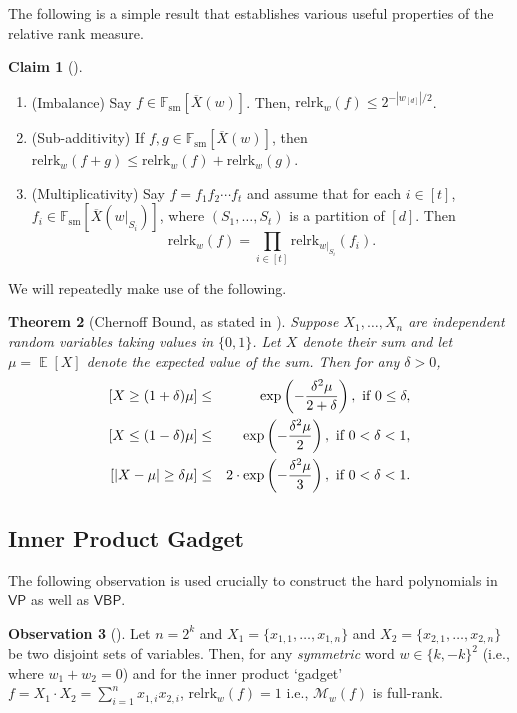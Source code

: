 \documentclass[10pt,a4paper]{article}
\newtheorem{theorem}{Theorem}[section]
\theoremstyle{definition}%
\newtheorem{claim}[theorem]{Claim}
\newtheorem{obs}[theorem]{Observation}
\theoremstyle{plain}
\DeclareMathOperator*{\E}{\mathbb{E}}
\let\Pr\relax
\DeclareMathOperator*{\Pr}{\mathbb{P}}
\newcommand{\rk}{\mathrm{relrk}}
\newcommand{\VP}{\mathsf{VP}}
\newcommand{\VBP}{\mathsf{VBP}}
\newcommand{\zo}{\{0,1\}}
\newcommand{\sumi}{\sum_{i=1}^n}
\newcommand{\Fsm}{\mathbb{F}_{\mathrm{sm}}}
\newcommand{\ol}[1]{\overline{#1}}
\newcommand{\calM}{\mathcal{M}}
\begin{document}
The following is a simple result that establishes various useful properties of the relative rank measure.
\begin{claim}[\cite{LST1}]\label{clm:rk-props}
\begin{enumerate}
    \item(Imbalance) Say $f \in \Fsm[\ol{X}(w)]$. Then, $\rk_w(f)\leq 2^{-|w_{[d]}|/2}$.
    \item(Sub-additivity) If $f,g \in \Fsm[\ol{X}(w)]$, then $\rk_w(f+g)\leq \rk_w(f)+\rk_w(g)$.
    \item(Multiplicativity) Say $f = f_1 f_2\cdots f_t $ and assume that for each $i\in [t]$, $f_i\in \Fsm[\ol{X}(w|_{S_i})]$, where $(S_1, \ldots, S_t)$ is a partition of $[d]$. Then
    \[
    \rk_w(f) = \prod_{i\in[t]} \rk_{w|_{S_i}}(f_i).
    \]
\end{enumerate}
\end{claim}

We will repeatedly make use of the following.

\begin{theorem}[Chernoff Bound, as stated in \cite{mitzenmacher_upfal_2005}]\label{thm:Chernoff}
Suppose $X_1, \ldots, X_n$ are independent random variables taking values in $\zo$. Let $X$ denote their sum and let $\mu = \E[X]$ denote the expected value of the sum. Then for any $\delta > 0$,
\begin{eqnarray*} \Pr[X\ge (1+\delta)\mu] &\le& \exp\left(-\frac{\delta^2\mu}{2+\delta}\right), \text{ if }0\leq \delta, \\
  \Pr[X\le (1-\delta)\mu] &\le& \exp\left(-\frac{\delta^2\mu}{2}\right), \text{ if }0< \delta <1, \\ 
  \Pr[|X-\mu|\geq \delta \mu]&\leq& 2\cdot \exp\left(-\frac{\delta^2\mu}{3}\right),\text{ if }0< \delta <1.\\
\end{eqnarray*}
\end{theorem}

\subsection{Inner Product Gadget}
The following observation is used crucially to construct the hard polynomials in $\VP$ as well as $\VBP$. 
\begin{obs}[\cite{KushS23}]\label{obs:ip-full-rank}
    Let $n = 2^k$ and $X_1 = \{x_{1,1},\ldots,x_{1,n}\}$ and $X_2 = \{x_{2,1},\ldots,x_{2,n}\}$ be two disjoint sets of variables. Then, for any \emph{symmetric} word $w\in\{k,-k\}^2$ (i.e., where $w_1 + w_2 = 0$) and for the inner product `gadget' $ f = X_1\cdot X_2 = \sumi x_{1,i}x_{2,i}$, $\rk_w(f) = 1$ i.e., $\calM_w(f)$ is full-rank.
\end{obs}
\end{document}
